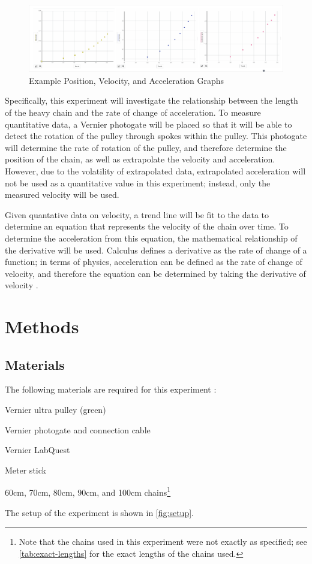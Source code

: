 \documentclass[stu,biblatex,floatsintext]{apa7}
\begin{document}
\begin{figure}[H]
	\centering
	\caption{Example Position, Velocity, and Acceleration Graphs}
	\label{fig:example-graphs}
	\includegraphics[width=\textwidth]{example-graphs}
\end{figure}

Specifically, this experiment will investigate the relationship between the length of the heavy chain and the rate of change of acceleration. To measure quantitative data, a Vernier photogate will be placed so that it will be able to detect the rotation of the pulley through spokes within the pulley. This photogate will determine the rate of rotation of the pulley, and therefore determine the position of the chain, as well as extrapolate the velocity and acceleration. However, due to the volatility of extrapolated data, extrapolated acceleration will not be used as a quantitative value in this experiment; instead, only the measured velocity will be used.

Given quantative data on velocity, a trend line will be fit to the data to determine an equation that represents the velocity of the chain over time. To determine the acceleration from this equation, the mathematical relationship of the derivative will be used. Calculus defines a derivative as the rate of change of a function; in terms of physics, acceleration can be defined as the rate of change of velocity, and therefore the equation can be determined by taking the derivative of velocity \parencite{Johnson2020VelocityVsAcceleration}.

\section{Methods}

\subsection{Materials}
The following materials are required for this experiment \parencite{Hilsdorf2023AtwoodsHeavyChainHandout}:
\begin{APAitemize}
	\item Vernier ultra pulley (green)
	\item Vernier photogate and connection cable
	\item Vernier LabQuest
	\item Meter stick
	\item 60\unit{\centi\meter}, 70\unit{\centi\meter}, 80\unit{\centi\meter}, 90\unit{\centi\meter}, and 100\unit{\centi\meter} chains\footnote{Note that the chains used in this experiment were not exactly as specified; see \autoref{tab:exact-lengths} for the exact lengths of the chains used.}
\end{APAitemize}
The setup of the experiment is shown in \autoref{fig:setup}.
\end{document}

